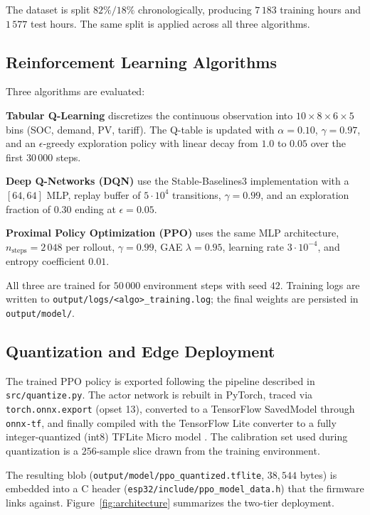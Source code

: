 \documentclass[conference]{IEEEtran}
\begin{document}
The dataset is split $82\%/18\%$ chronologically, producing $7\,183$ training hours and $1\,577$ test hours. The same split is applied across all three algorithms.

\subsection{Reinforcement Learning Algorithms}
\label{ssec:algos}

Three algorithms are evaluated:

\textbf{Tabular Q-Learning} \cite{watkins1989,sutton2018} discretizes the continuous observation into $10 \times 8 \times 6 \times 5$ bins (SOC, demand, PV, tariff). The Q-table is updated with $\alpha = 0.10$, $\gamma = 0.97$, and an $\epsilon$-greedy exploration policy with linear decay from $1.0$ to $0.05$ over the first $30\,000$ steps.

\textbf{Deep Q-Networks (DQN)} \cite{mnih2015} use the Stable-Baselines3 \cite{raffin2021} implementation with a $[64, 64]$ MLP, replay buffer of $5 \cdot 10^4$ transitions, $\gamma = 0.99$, and an exploration fraction of $0.30$ ending at $\epsilon = 0.05$.

\textbf{Proximal Policy Optimization (PPO)} \cite{schulman2017} uses the same MLP architecture, $n_{\text{steps}} = 2\,048$ per rollout, $\gamma = 0.99$, GAE $\lambda = 0.95$, learning rate $3 \cdot 10^{-4}$, and entropy coefficient $0.01$.

All three are trained for $50\,000$ environment steps with seed $42$. Training logs are written to \texttt{output/logs/<algo>\_training.log}; the final weights are persisted in \texttt{output/model/}.

\subsection{Quantization and Edge Deployment}
\label{ssec:quant}

The trained PPO policy is exported following the pipeline described in \texttt{src/quantize.py}. The actor network is rebuilt in PyTorch, traced via \texttt{torch.onnx.export} (opset 13), converted to a TensorFlow SavedModel through \texttt{onnx-tf}, and finally compiled with the TensorFlow Lite converter to a fully integer-quantized (int8) TFLite Micro model \cite{david2021}. The calibration set used during quantization is a $256$-sample slice drawn from the training environment.

The resulting blob (\texttt{output/\allowbreak model/\allowbreak ppo\_quantized.tflite}, $38{,}544$ bytes) is embedded into a C header (\texttt{esp32/\allowbreak include/\allowbreak ppo\_model\_data.h}) that the firmware links against. Figure~\ref{fig:architecture} summarizes the two-tier deployment.
\end{document}
